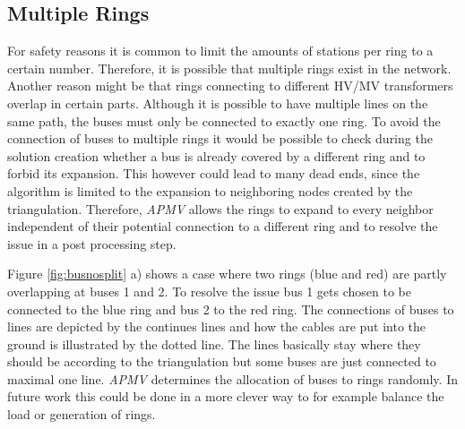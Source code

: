 \subsection{Multiple Rings}
For safety reasons it is common to limit the amounts of stations per ring to a certain number. Therefore, it is possible that multiple rings exist in the network. Another reason might be that rings connecting to different HV/MV transformers overlap in certain parts. Although it is possible to have multiple lines on the same path, the buses must only be connected to exactly one ring. To avoid the connection of buses to multiple rings it would be possible to check during the solution creation whether a bus is already covered by a different ring and to forbid its expansion. This however could lead to many dead ends, since the algorithm is limited to the expansion to neighboring nodes created by the triangulation. Therefore, \textit{APMV} allows the rings to expand to every neighbor independent of their potential connection to a different ring and to resolve the issue in a post processing step.

Figure \ref{fig:busnosplit} a) shows a case where two rings (blue and red) are partly overlapping at buses 1 and 2. To resolve the issue bus 1 gets chosen to be connected to the blue ring and bus 2 to the red ring. The connections of buses to lines are depicted by the continues lines and how the cables are put into the ground is illustrated by the dotted line. The lines basically stay where they should be according to the triangulation but some buses are just connected to maximal one line. \textit{APMV} determines the allocation of buses to rings randomly. In future work this could be done in a more clever way to for example balance the load or generation of rings.

